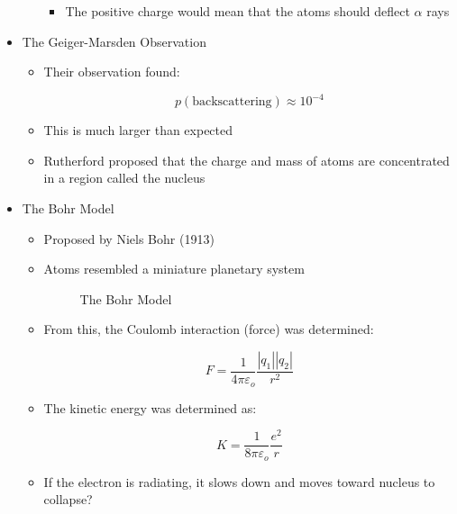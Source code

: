 \begin{itemize}
\begin{itemize}
\begin{itemize}
          \item The positive charge would mean that the atoms should deflect $\alpha$ rays

        \end{itemize}

    \end{itemize}

  \item The Geiger-Marsden Observation

    \begin{itemize}

      \item Their observation found:

        $$p(\text{backscattering})\approx 10^{-4}$$

      \item This is much larger than expected

      \item Rutherford proposed that the charge and mass of atoms are concentrated in a region called the nucleus

    \end{itemize}

  \item The Bohr Model

    \begin{itemize}

      \item Proposed by Niels Bohr (1913)

      \item Atoms resembled a miniature planetary system

        \begin{figure}[h!]
          \centering
          
          \caption{The Bohr Model}
          \label{fig:2}
        \end{figure}

      \item From this, the Coulomb interaction (force) was determined:

        $$\boxed{F=\frac{1}{4\pi\varepsilon_o}\frac{|q_1||q_2|}{r^2}}$$

      \item The kinetic energy was determined as:

        $$\boxed{K=\frac{1}{8\pi\varepsilon_o}\frac{e^2}{r}}$$

      \item If the electron is radiating, it slows down and moves toward nucleus to collapse?


\end{itemize}
\end{itemize}
